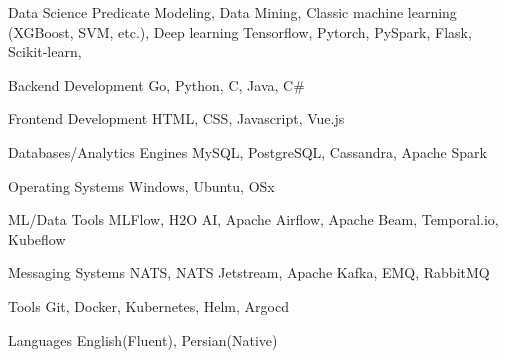 

\begin{cvskills}

  \cvskill
    {Data Science} %
    {
      Predicate Modeling, Data Mining, Classic machine learning (XGBoost, SVM, etc.), Deep learning
      Tensorflow, Pytorch, PySpark, Flask, Scikit‐learn,
} %

  \cvskill
    {Backend Development} %
    {Go, Python, C, Java, C\#} %

  \cvskill
    {Frontend Development} %
    {HTML, CSS, Javascript, Vue.js} %

  \cvskill
    {Databases/Analytics Engines} %
    {MySQL, PostgreSQL, Cassandra, Apache Spark} %

  \cvskill
    {Operating Systems} %
    {Windows, Ubuntu, OSx} %

  \cvskill
    {ML/Data Tools} %
    {MLFlow, H2O AI, Apache Airflow, Apache Beam, Temporal.io, Kubeflow} %

  \cvskill
    {Messaging Systems} %
    {NATS, NATS Jetstream, Apache Kafka, EMQ, RabbitMQ} %

  \cvskill
    {Tools} %
    {Git, Docker, Kubernetes, Helm, Argocd} %

  \cvskill
    {Languages} %
    {English(Fluent), Persian(Native)} %

\end{cvskills}

